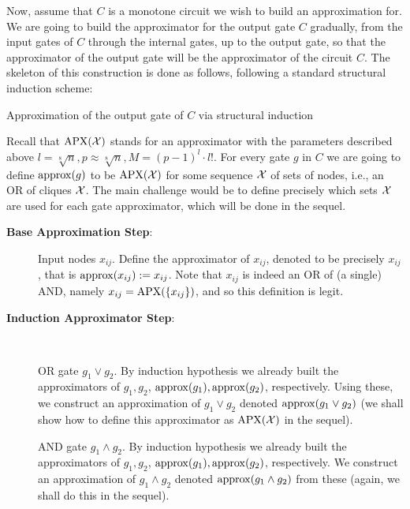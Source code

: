  

Now, assume that $C$ is a monotone circuit we wish to build an approximation for. We are going to build the approximator for the output gate $C$ gradually, from the input gates of $C$  through the internal gates, up to the output gate, so that the approximator of the output gate will be the approximator of the circuit $C$. The skeleton of this construction is done as follows, following a standard structural induction scheme:


\newcommand{\gapx}{\ensuremath{{\rm approx}}}

\begin{trailer}
{Approximation of the output gate of $C$ via structural induction}

Recall that $\mathrm{APX}({\mathcal X})$ stands for an approximator with the parameters described above $ l=\sqrt[8]{n} , p \approx \sqrt[8]{n}, M=(p-1)^l \cdot l!$.
For every gate $g$ in $C$ we are going to define $\gapx(g)$ to be $\mathrm{APX}(\mathcal{X})$ for some sequence $\mathcal{X}$ of sets of nodes, i.e., an OR of cliques $\mathcal{X}$. The main challenge would be to define precisely which sets $\mathcal{X}$ are used for each gate approximator, which will be done in the sequel.


\begin{description}
\item[\textbf{Base Approximation Step}:] 
Input nodes $x_{ij}$. Define the approximator of $x_{ij}$, denoted  to be precisely $x_{ij}$, that is $\gapx(x_{ij}):=x_{ij}$.
Note that $x_{ij}$ is indeed an OR of (a single) AND, namely $x_{ij}=\mathrm{APX}(\{x_{ij}\})$, and so this definition is legit.

\item[\textbf{Induction  Approximator Step}:]\

 OR gate $g_1\lor g_2$. By induction hypothesis we already built the approximators of $g_1,g_2$, $\gapx(g_1),\gapx(g_2)$, respectively. Using these, we construct an approximation of $g_1\lor g_2$ denoted $\gapx(g_1\lor g_2)$  (we shall show how to define this approximator as $\mathrm{APX}(\mathcal{X})$ in the  sequel).

 AND gate $g_1\land g_2$. 
By induction hypothesis we already built the approximators 
of $g_1,g_2$, $\gapx(g_1),\gapx(g_2)$, respectively. 
We construct an approximation of $g_1\land g_2$ denoted 
$\gapx(g_1\land g_2)$ from these (again, we shall do this in the sequel).
\end{description} 
\end{trailer}


